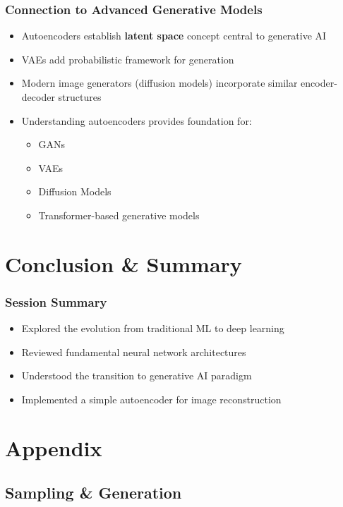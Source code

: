 \documentclass[5pt,aspectratio=169]{beamer}
\begin{document}
\begin{frame}
\frametitle{Connection to Advanced Generative Models}
\begin{itemize}
    \item Autoencoders establish \textbf{latent space} concept central to generative AI
    \item VAEs add probabilistic framework for generation
    \item Modern image generators (diffusion models) incorporate similar encoder-decoder structures
    \item Understanding autoencoders provides foundation for:
    \begin{itemize}
        \item GANs
        \item VAEs
        \item Diffusion Models
        \item Transformer-based generative models
    \end{itemize}
\end{itemize}
\end{frame}

\section{Conclusion \& Summary}
\begin{frame}
\frametitle{Session Summary}
\begin{itemize}
    \item Explored the evolution from traditional ML to deep learning
    \item Reviewed fundamental neural network architectures
    \item Understood the transition to generative AI paradigm
    \item Implemented a simple autoencoder for image reconstruction
\end{itemize}
\end{frame}



\section{Appendix}
\subsection{Sampling \& Generation}
\end{document}
